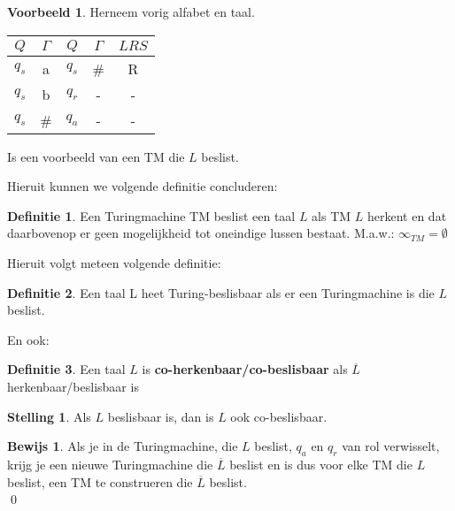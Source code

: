 \documentclass[12pt,a4paper]{article}
\theoremstyle{definition}
\newtheorem{defi}{Definitie}[section]
\newtheorem{stel}{Stelling}[section]
\newtheorem{vb}{Voorbeeld}[section]
\newtheorem{bewijs}{Bewijs}[section]
\begin{document}
	\begin{vb}
		Herneem vorig alfabet en taal.\\
		\begin{table}[H]
			\centering
			\begin{tabular}{|c|c|c|c|c|}
				\hline $Q$ & $\Gamma$ & $Q$ & $\Gamma$ & $LRS$ \\ 
				\hline $q_s$ & a & $q_s$ & \# & R \\ 
				$q_s$ & b & $q_r$ & - & - \\ 
				$q_s$ & \# & $q_a$ & - & - \\ 
				\hline
			\end{tabular} 
		\end{table}	
		Is een voorbeeld van een TM die $L$ beslist.
	\end{vb}
	Hieruit kunnen we volgende definitie concluderen:
	\begin{defi}
		Een Turingmachine TM beslist een taal $L$ als TM $L$ herkent en dat daarbovenop er geen mogelijkheid tot oneindige lussen bestaat. M.a.w.: $\infty_{TM} = \emptyset$
	\end{defi}
	Hieruit volgt meteen volgende definitie:
	\begin{defi}
		Een taal L heet Turing-beslisbaar als er een Turingmachine is die $L$ beslist.
	\end{defi}
	En ook:
	\begin{defi}
		Een taal $L$ is \textbf{co-herkenbaar/co-beslisbaar} als $\overline{L}$ herkenbaar/beslisbaar is
	\end{defi}
	\begin{stel}
		Als $L$ beslisbaar is, dan is $L$ ook co-beslisbaar.
		\begin{bewijs}
			Als je in de Turingmachine, die $L$ beslist, $q_a$ en $q_r$ van rol verwisselt, krijg je een nieuwe Turingmachine die $\overline{L}$ beslist en is dus voor elke TM die $L$ beslist, een TM te construeren die $\overline{L}$ beslist.\\ \qed
		\end{bewijs}
	\end{stel}
\end{document}
